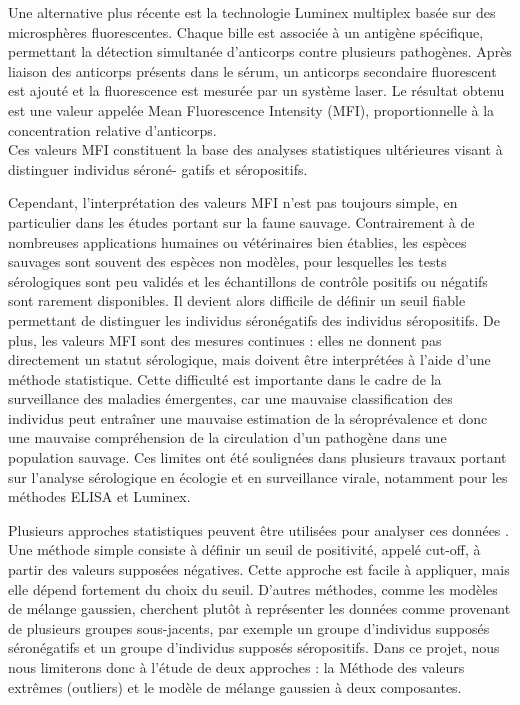 \documentclass[a4paper]{article}
\begin{document}
Une alternative plus récente est la technologie Luminex multiplex basée sur des microsphères fluorescentes. Chaque bille est associée à un antigène spécifique, permettant la détection simultanée d’anticorps contre plusieurs pathogènes. Après liaison des anticorps présents dans le sérum, un anticorps secondaire fluorescent est ajouté et la fluorescence est mesurée par un système laser. Le résultat obtenu est une valeur appelée Mean Fluorescence Intensity (MFI), proportionnelle à la concentration relative d’anticorps. \\

Ces valeurs MFI constituent la base des analyses statistiques ultérieures visant à distinguer individus séroné-
gatifs et séropositifs.

Cependant, l’interprétation des valeurs MFI n’est pas toujours simple, en particulier dans les études portant sur la faune sauvage. Contrairement à de nombreuses applications humaines ou vétérinaires bien établies, les espèces sauvages sont souvent des espèces non modèles, pour lesquelles les tests sérologiques sont peu validés et les échantillons de contrôle positifs ou négatifs sont rarement disponibles. Il devient alors difficile de définir un seuil fiable permettant de distinguer les individus séronégatifs des individus séropositifs. De plus, les valeurs MFI sont des mesures continues : elles ne donnent pas directement un statut sérologique, mais doivent être interprétées à l’aide d’une méthode statistique. Cette difficulté est importante dans le cadre de la surveillance des maladies émergentes, car une mauvaise classification des individus peut entraîner une mauvaise estimation de la séroprévalence et donc une mauvaise compréhension de la circulation d’un pathogène dans une population sauvage. Ces limites ont été soulignées dans plusieurs travaux portant sur l’analyse sérologique en écologie et en surveillance virale, notamment pour les méthodes ELISA et Luminex.

Plusieurs approches statistiques peuvent être utilisées pour analyser ces données \cite{kain2025} \cite{peeters2023}. \\
Une méthode simple consiste à définir un seuil de positivité, appelé cut-off, à partir des valeurs supposées négatives. Cette approche est facile à appliquer, mais elle dépend fortement du choix du seuil. D’autres méthodes, comme les modèles de mélange gaussien, cherchent plutôt à représenter les données comme provenant de plusieurs groupes sous-jacents, par exemple un groupe d’individus supposés séronégatifs et un groupe d’individus supposés séropositifs. Dans ce projet, nous nous limiterons donc à l’étude de deux approches : la Méthode des valeurs extrêmes (outliers) et le modèle de mélange gaussien à deux composantes.
\end{document}
